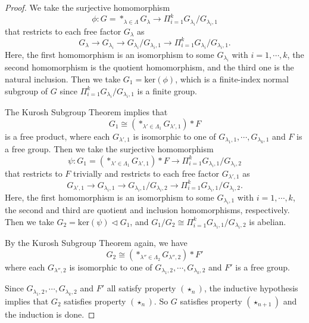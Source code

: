 \documentclass[10pt,a4paper]{amsart}
\begin{document}
\begin{proof}
We take the surjective homomorphism 
$$\phi:G=*_{\lambda\in \Lambda}G_{\lambda}\to \Pi_{i=1}^k G_{\lambda_i}/G_{\lambda_i,1}$$
that restricts to each free factor $G_{\lambda}$ as 
$$G_{\lambda}\to G_{\lambda_i}\to G_{\lambda_i}/G_{\lambda_i,1}\to \Pi_{i=1}^k G_{\lambda_i}/G_{\lambda_i,1}.$$
Here, the first homomorphism is an isomorphism to some $G_{\lambda_i}$ with $i=1,\cdots,k$, the second homomorphism is the quotient homomorphism, and the third one is the natural inclusion. Then we take $G_1=\text{ker}(\phi)$, which is a finite-index normal subgroup of $G$ since $\Pi_{i=1}^k G_{\lambda_i}/G_{\lambda_i,1}$ is a finite group. 

The Kurosh Subgroup Theorem implies that 
$$G_1\cong (*_{\lambda'\in \Lambda_1}G_{\lambda',1})*F$$ is a free product, where each $G_{\lambda',1}$ is isomorphic to one of $G_{\lambda_1,1},\cdots, G_{\lambda_k,1}$ and $F$ is a free group.
Then we take the surjective homomorphism 
$$\psi:G_1= (*_{\lambda'\in \Lambda_1}G_{\lambda',1})*F\to \Pi_{i=1}^k G_{\lambda_i,1}/G_{\lambda_i,2}$$
that restricts to $F$ trivially and restricts to each free factor $G_{\lambda',1}$ as 
$$G_{\lambda',1}\to G_{\lambda_i,1}\to G_{\lambda_i,1}/G_{\lambda_i,2}\to \Pi_{i=1}^k G_{\lambda_i,1}/G_{\lambda_i,2}.$$
Here, the first homomorphism is an isomorphism to some $G_{\lambda_i,1}$ with $i=1,\cdots,k$, the second and third are quotient and inclusion homomorphisms, respectively. Then we take $G_2=\text{ker}(\psi)\vartriangleleft G_1$, and $G_1/G_2\cong\Pi_{i=1}^k G_{\lambda_i,1}/G_{\lambda_i,2}$ is abelian. 

By the Kurosh Subgroup Theorem again, we have $$G_2\cong (*_{\lambda''\in \Lambda_2}G_{\lambda'',2})*F'$$
where each $G_{\lambda'',2}$ is isomorphic to one of $G_{\lambda_1,2},\cdots, G_{\lambda_k,2}$ and $F'$ is a free group. 

Since $G_{\lambda_1,2},\cdots, G_{\lambda_k,2}$ and $F'$ all satisfy property $(\star_n)$, the inductive hypothesis implies that $G_2$ satisfies property $(\star_n)$. So $G$ satisfies property $(\star_{n+1})$ and the induction is done.
\end{proof}
\end{document}
